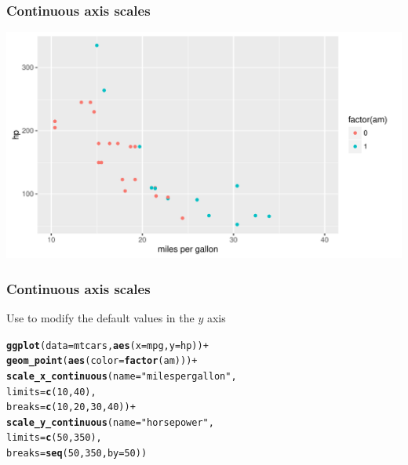 \documentclass[12pt]{beamer}\usepackage[]{graphicx}\usepackage[]{color}
\makeatletter
\newcommand{\hlnum}[1]{\textcolor[rgb]{0.686,0.059,0.569}{#1}}%
\newcommand{\hlstr}[1]{\textcolor[rgb]{0.192,0.494,0.8}{#1}}%
\newcommand{\hlopt}[1]{\textcolor[rgb]{0,0,0}{#1}}%
\newcommand{\hlstd}[1]{\textcolor[rgb]{0.345,0.345,0.345}{#1}}%
\newcommand{\hlkwc}[1]{\textcolor[rgb]{0.333,0.667,0.333}{#1}}%
\newcommand{\hlkwd}[1]{\textcolor[rgb]{0.737,0.353,0.396}{\textbf{#1}}}%
\newenvironment{kframe}{%
 \def\at@end@of@kframe{}%
 \ifinner\ifhmode%
  \def\at@end@of@kframe{\end{minipage}}%
  \begin{minipage}{\columnwidth}%
 \fi\fi%
 \def\FrameCommand##1{\hskip\@totalleftmargin \hskip-\fboxsep
 \colorbox{shadecolor}{##1}\hskip-\fboxsep
     \hskip-\linewidth \hskip-\@totalleftmargin \hskip\columnwidth}%
 \MakeFramed {\advance\hsize-\width
   \@totalleftmargin\z@ \linewidth\hsize
   \@setminipage}}%
 {\par\unskip\endMakeFramed%
 \at@end@of@kframe}
\newenvironment{knitrout}{}{} %
\makeatother
\begin{document}
\begin{frame}[fragile]
\frametitle{Continuous axis scales}
\begin{knitrout}\footnotesize
{}\color{fgcolor}

{\centering \includegraphics[width=.9\linewidth,height=.5\linewidth]{figure/scale_x-1} 

}



\end{knitrout}
\end{frame}


\begin{frame}[fragile]
\frametitle{Continuous axis scales}
Use  to modify the default values in the $y$ axis
\begin{knitrout}\footnotesize
{}\color{fgcolor}\begin{kframe}
\begin{alltt}
\hlkwd{ggplot}\hlstd{(}\hlkwc{data} \hlstd{= mtcars,} \hlkwd{aes}\hlstd{(}\hlkwc{x} \hlstd{= mpg,} \hlkwc{y} \hlstd{= hp))} \hlopt{+}
  \hlkwd{geom_point}\hlstd{(}\hlkwd{aes}\hlstd{(}\hlkwc{color} \hlstd{=} \hlkwd{factor}\hlstd{(am)))} \hlopt{+}
  \hlkwd{scale_x_continuous}\hlstd{(}\hlkwc{name} \hlstd{=} \hlstr{"miles per gallon"}\hlstd{,}
                     \hlkwc{limits} \hlstd{=} \hlkwd{c}\hlstd{(}\hlnum{10}\hlstd{,} \hlnum{40}\hlstd{),}
                     \hlkwc{breaks} \hlstd{=} \hlkwd{c}\hlstd{(}\hlnum{10}\hlstd{,} \hlnum{20}\hlstd{,} \hlnum{30}\hlstd{,} \hlnum{40}\hlstd{))} \hlopt{+}
  \hlkwd{scale_y_continuous}\hlstd{(}\hlkwc{name} \hlstd{=} \hlstr{"horsepower"}\hlstd{,}
                     \hlkwc{limits} \hlstd{=} \hlkwd{c}\hlstd{(}\hlnum{50}\hlstd{,} \hlnum{350}\hlstd{),}
                     \hlkwc{breaks} \hlstd{=} \hlkwd{seq}\hlstd{(}\hlnum{50}\hlstd{,} \hlnum{350}\hlstd{,} \hlkwc{by} \hlstd{=} \hlnum{50}\hlstd{))}
\end{alltt}
\end{kframe}
\end{knitrout}
\end{frame}
\end{document}
